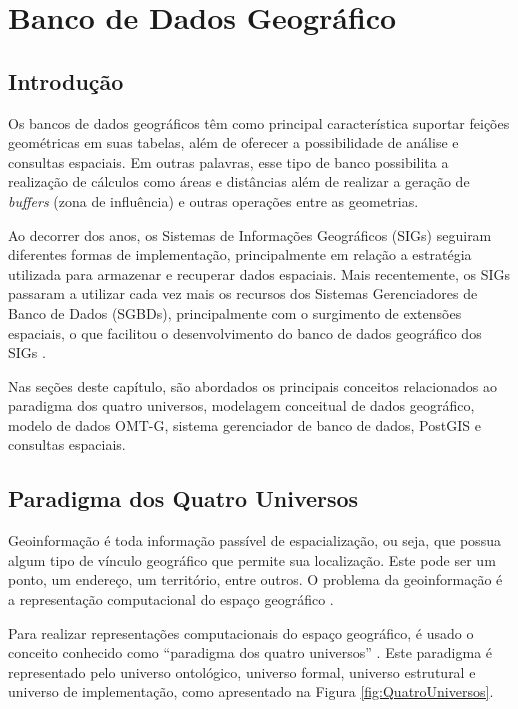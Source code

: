 \chapter{Banco de Dados Geográfico}
\label{cap:bd}

\section{Introdução}

Os bancos de dados geográficos têm como principal característica suportar feições geométricas em suas tabelas, além de oferecer a possibilidade de análise e consultas espaciais. Em outras palavras, esse tipo de banco possibilita a realização de cálculos como áreas e distâncias além de realizar a geração de \textit{buffers} (zona de influência) e outras operações entre as geometrias.

Ao decorrer dos anos, os Sistemas de Informações Geográficos (SIGs) seguiram diferentes formas de implementação, principalmente em relação a estratégia utilizada para armazenar e recuperar dados espaciais. Mais recentemente, os SIGs passaram a utilizar cada vez mais os recursos dos Sistemas Gerenciadores de Banco de Dados (SGBDs), principalmente com o surgimento de extensões espaciais, o que facilitou o desenvolvimento do banco de dados geográfico dos SIGs \cite{gisasp}.

Nas seções deste capítulo, são abordados os principais conceitos relacionados ao paradigma dos quatro universos, modelagem conceitual de dados geográfico, modelo de dados OMT-G, sistema gerenciador de banco de dados, PostGIS e consultas espaciais.

\section{Paradigma dos Quatro Universos}
\label{quatro-universos}

Geoinformação é toda informação passível de espacialização, ou seja, que possua algum tipo de vínculo geográfico que permite sua localização. Este pode ser um ponto, um endereço, um território, entre outros. O problema da geoinformação é a representação computacional do espaço geográfico \cite{harley}.

Para realizar representações computacionais do espaço geográfico, é usado o conceito conhecido como “paradigma dos quatro universos” \cite{velhogomes}. Este paradigma é representado pelo universo ontológico, universo formal, universo estrutural e universo de implementação, como apresentado na Figura \ref{fig:QuatroUniversos}.

